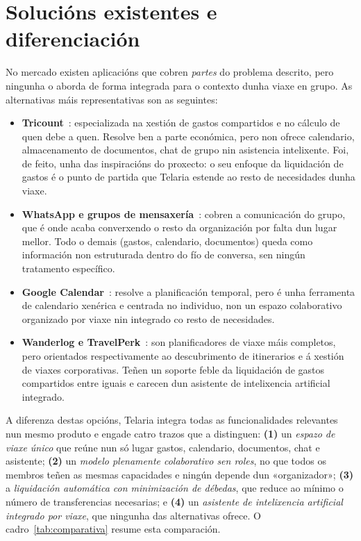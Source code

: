 \section{Solucións existentes e diferenciación}

No mercado existen aplicacións que cobren \textit{partes} do problema descrito, pero
ningunha o aborda de forma integrada para o contexto dunha viaxe en grupo. As
alternativas máis representativas son as seguintes:

\begin{itemize}
  \item \textbf{Tricount}~\cite{tricount}: especializada na xestión de gastos
        compartidos e no cálculo de quen debe a quen. Resolve ben a parte económica, pero
        non ofrece calendario, almacenamento de documentos, chat de grupo nin asistencia
        intelixente. Foi, de feito, unha das inspiracións do proxecto: o seu enfoque da
        liquidación de gastos é o punto de partida que Telaria estende ao resto de
        necesidades dunha viaxe.
  \item \textbf{WhatsApp e grupos de mensaxería}~\cite{whatsapp}: cobren a comunicación
        do grupo, que é onde acaba converxendo o resto da organización por falta dun lugar
        mellor. Todo o demais (gastos, calendario, documentos) queda como información non
        estruturada dentro do fío de conversa, sen ningún tratamento específico.
  \item \textbf{Google Calendar}~\cite{googlecalendar}: resolve a planificación temporal,
        pero é unha ferramenta de calendario xenérica e centrada no individuo, non un
        espazo colaborativo organizado por viaxe nin integrado co resto de necesidades.
  \item \textbf{Wanderlog e TravelPerk}~\cite{wanderlog,travelperk}: son planificadores
        de viaxe máis completos, pero orientados respectivamente ao descubrimento de
        itinerarios e á xestión de viaxes corporativas. Teñen un soporte feble da
        liquidación de gastos compartidos entre iguais e carecen dun asistente de
        intelixencia artificial integrado.
\end{itemize}

A diferenza destas opcións, Telaria integra todas as funcionalidades relevantes nun mesmo produto e engade catro
trazos que a distinguen: \textbf{(1)} un \textit{espazo de viaxe único} que reúne nun
só lugar gastos, calendario, documentos, chat e asistente; \textbf{(2)} un \textit{modelo
plenamente colaborativo sen roles}, no que todos os membros teñen as mesmas capacidades e
ningún depende dun «organizador»; \textbf{(3)} a \textit{liquidación automática con
minimización de débedas}, que reduce ao mínimo o número de transferencias necesarias; e
\textbf{(4)} un \textit{asistente de intelixencia artificial integrado por viaxe}, que
ningunha das alternativas ofrece. O cadro~\ref{tab:comparativa} resume esta comparación.

